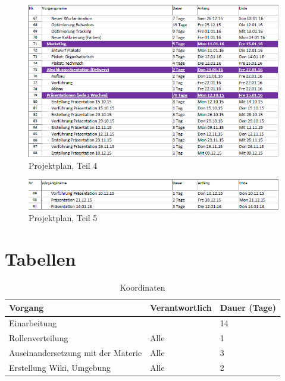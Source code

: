 \begin{appendix}
            \begin{figure}[ht]
                \centering
                \includegraphics[width=0.99\textwidth]{src/pictures/planung4.png}
                \caption{Projektplan, Teil 4}
                \label{img:planung4}
            \end{figure}

            \begin{figure}[ht]
                \centering
                \includegraphics[width=0.99\textwidth]{src/pictures/planung5.png}
                \caption{Projektplan, Teil 5}
                \label{img:planung5}
            \end{figure}

    \chapter{Tabellen}

        \begin{table}[h]
            \caption{Koordinaten}
            \label{tbl:cmtbl}
            \begin{center}
                \begin{tabular}[]{| l | l | l |}
                    Vorgang & Verantwortlich & Dauer (Tage) \\
                    \hline

                    Einarbeitung                       &      & 14 \\
                    \hline
                    Rollenverteilung                   & Alle & 1 \\
                    Auseinandersetzung mit der Materie & Alle & 3 \\
                    Erstellung Wiki, Umgebung          & Alle & 2 \\


\end{tabular}
\end{center}
\end{table}
\end{appendix}
